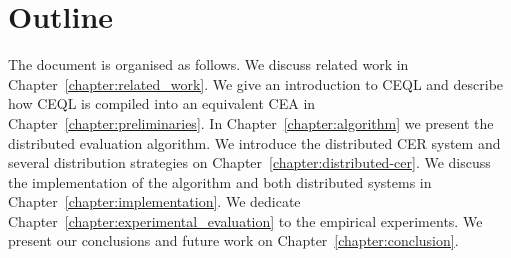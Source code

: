 \section{Outline}
\label{sec:outline}

The document is organised as follows. We discuss related work in Chapter~\ref{chapter:related_work}. We give an introduction to CEQL and describe how CEQL is compiled into an equivalent CEA in Chapter~\ref{chapter:preliminaries}. In Chapter~\ref{chapter:algorithm} we present the distributed evaluation algorithm. We introduce the distributed CER system and several distribution strategies on Chapter~\ref{chapter:distributed-cer}. We discuss the implementation of the algorithm and both distributed systems in Chapter~\ref{chapter:implementation}. We dedicate Chapter~\ref{chapter:experimental_evaluation} to the empirical experiments. We present our conclusions and future work on Chapter~\ref{chapter:conclusion}.

